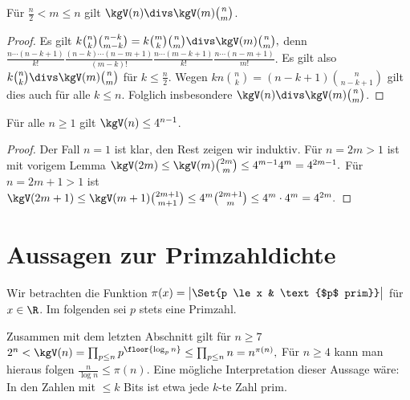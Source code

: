 \begin{lem}
    Für $\frac{n}{2} < m \le n$ gilt $\kgV(n) \divs \kgV(m) \binom{n}{m}$.
    \begin{proof}
        Es gilt
        \begin{math}
            k \binom{n}{k} \binom{n-k}{m-k} = k \binom{m}{k} \binom{n}{m} \divs \kgV(m) \binom{n}{m},
        \end{math}
        denn
        \begin{math}
            \frac{n \dotsb (n-k+1)}{k!} \frac{(n-k) \dotsb (n-m+1)}{(m-k)!}
            \frac{n \dotsb (m-k+1)}{k!} \frac{n \dotsb (n-m+1)}{m!}.
        \end{math}
        Es gilt also $k \binom{n}{k} \divs \kgV(m) \binom{n}{m}$ für $k \le \frac{n}{2}$.
        Wegen $k n \binom{n}{k} = (n-k+1)\binom{n}{n-k+1}$ gilt dies auch für alle $k \le n$.
        Folglich insbesondere $\kgV(n) \divs \kgV(m) \binom{n}{m}$.
    \end{proof}
\end{lem}

\begin{st}
    Für alle $n \ge 1$ gilt $\kgV(n) \le 4^{n-1}$.
    \begin{proof}
        Der Fall $n = 1$ ist klar, den Rest zeigen wir induktiv.
        Für $n = 2m > 1$ ist mit vorigem Lemma
        \begin{math}
            \kgV(2m) \le \kgV(m) \binom{2m}{m}
            \le 4^{m-1} 4^m
            = 4^{2m-1}.
        \end{math}
        Für $n = 2m + 1 > 1$ ist
        \begin{math}
            \kgV(2m + 1) \le \kgV(m+1) \binom{2m+1}{m+1}
            \le 4^m \binom{2m + 1}{m}
            \le 4^m  \cdot 4^m
            = 4^{2m}.
        \end{math}
    \end{proof}
\end{st}

\section{Aussagen zur Primzahldichte}


Wir betrachten die Funktion
\begin{math}
    \pi(x) = \big| \Set{p \le x & \text{$p$ prim}} \big|
\end{math}
für $x \in \R$.
Im folgenden sei $p$ stets eine Primzahl.

Zusammen mit dem letzten Abschnitt gilt für $n \ge 7$
\begin{math}
    2^n < \kgV(n) = \prod_{p\le n} p^{\floor{\log_p n}} \le \prod_{p \le n} n = n^{\pi(n)},
\end{math}
Für $n \ge 4$ kann man hieraus folgen
\begin{math}
    \frac{n}{\log n} \le \pi(n).
\end{math}
Eine mögliche Interpretation dieser Aussage wäre: In den Zahlen mit $\le k$ Bits ist etwa jede $k$-te Zahl prim.

